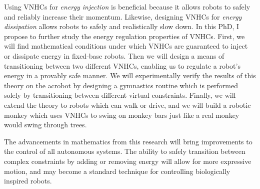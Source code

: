\documentclass[a4paper,12pt]{article}
\begin{document}
Using VNHCs for \textit{energy injection} is beneficial because it allows robots to
safely and reliably increase their momentum.
Likewise, designing VNHCs for \textit{energy dissipation} allows robots to
safely and realistically slow down.
In this PhD, I propose to further study the energy regulation properties of VNHCs.
First, we will find mathematical conditions under which VNHCs are guaranteed to
inject or dissipate energy in fixed-base robots.
Then we will design a means of transitioning between two different VNHCs,
enabling us to regulate a robot's energy in a provably safe manner.
We will experimentally verify the results of this theory on the acrobot by
designing a gymnastics routine which is performed solely by transitioning
between different virtual constraints.
Finally, we will extend the theory to robots which can walk or drive, 
and we will build a robotic monkey which uses VNHCs to swing on monkey bars just
like a real monkey would swing through trees.

The advancements in mathematics from this research will bring improvements
to the control of all autonomous systems. 
The ability to safely transition between complex constraints by adding or
removing energy will allow for more expressive motion, and may become a standard
technique for controlling biologically inspired robots.

\newpage
\printbibliography
\end{document}
